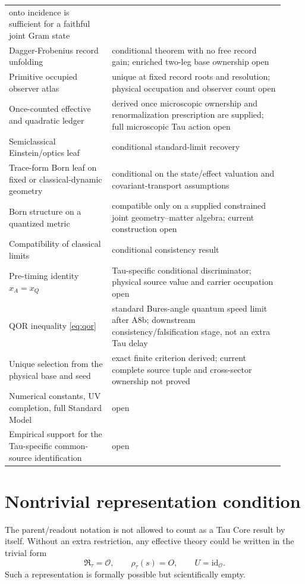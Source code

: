 \documentclass[11pt]{article}
\newcommand{\RTspace}{\mathfrak R_{\tau}}
\newcommand{\Rmap}{\rho_{\tau}}
\newcommand{\Obs}{\mathcal O}
\begin{document}
\begin{longtable}{L{0.34\linewidth}L{0.58\linewidth}}
onto incidence is sufficient for a faithful joint Gram state\\
Dagger-Frobenius record unfolding & conditional theorem with no free record
gain; enriched two-leg base ownership open\\
Primitive occupied observer atlas & unique at fixed record roots and
resolution; physical occupation and observer count open\\
Once-counted effective and quadratic ledger & derived once microscopic
ownership and renormalization prescription are supplied; full microscopic
Tau action open\\
Semiclassical Einstein/optics leaf & conditional standard-limit recovery\\
Trace-form Born leaf on fixed or classical-dynamic geometry & conditional on
the state/effect valuation and covariant-transport assumptions\\
Born structure on a quantized metric & compatible only on a supplied
constrained joint geometry--matter algebra; current construction open\\
Compatibility of classical limits & conditional consistency result\\
Pre-timing identity \(x_A=x_Q\) & Tau-specific conditional discriminator;
physical source value and carrier occupation open\\
QOR inequality \eqref{eq:qor} & standard Bures-angle quantum speed limit after
A8b; downstream consistency/falsification stage, not an extra Tau delay\\
Unique selection from the physical base and seed & exact finite criterion
derived; current complete source tuple and cross-sector ownership not proved\\
Numerical constants, UV completion, full Standard Model & open\\
Empirical support for the Tau-specific common-source identification & open\\
\bottomrule
\end{longtable}
\normalsize

\section{Nontrivial representation condition}

The parent/readout notation is not allowed to count as a Tau Core result by
itself.  Without an extra restriction, any effective theory could be written in
the trivial form
\[
  \RTspace=\Obs,\qquad \Rmap(s)=O,\qquad U=\mathrm{id}_{\Obs}.
\]
Such a representation is formally possible but scientifically empty.
\end{document}
